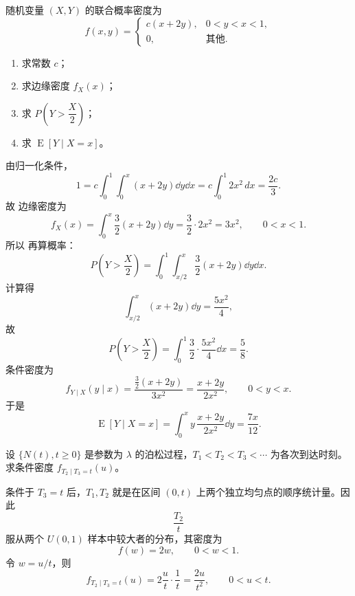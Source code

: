 \begin{question}
随机变量 $(X,Y)$ 的联合概率密度为
\[
f(x,y)=\begin{cases}
 c(x+2y),&0<y<x<1,\\
 0,&\text{其他}.
\end{cases}
\]
\begin{enumerate}
\item 求常数 $c$；
\item 求边缘密度 $f_X(x)$；
\item 求 $P\!\left(Y>\dfrac{X}{2}\right)$；
\item 求 $\operatorname{E}[Y\mid X=x]$。
\end{enumerate}
\begin{solution}
由归一化条件，
\[
1=c\int_0^1\int_0^x (x+2y)\dd{y}\dd{x}
=c\int_0^1 2x^2\,dx
=\frac{2c}{3}.
\]
故
边缘密度为
\[
f_X(x)=\int_0^x \frac32(x+2y)\dd{y}
=\frac32\cdot 2x^2=3x^2,
\qquad 0<x<1.
\]
所以
再算概率：
\[
P\!\left(Y>\frac X2\right)=\int_0^1\int_{x/2}^{x}\frac32(x+2y)\dd{y}\dd{x}.
\]
计算得
\[
\int_{x/2}^{x}(x+2y)\dd{y}=\frac{5x^2}{4},
\]
故
\[
P\!\left(Y>\frac X2\right)=\int_0^1 \frac32\cdot \frac{5x^2}{4}\dd{x}=\frac58.
\]
条件密度为
\[
f_{Y\mid X}(y\mid x)=\frac{\frac32(x+2y)}{3x^2}=\frac{x+2y}{2x^2},
\qquad 0<y<x.
\]
于是
\[
\operatorname{E}[Y\mid X=x]=\int_0^x y\,\frac{x+2y}{2x^2}\dd{y}=\frac{7x}{12}.
\]
\end{solution}
\end{question}

\begin{question}
设 $\{N(t),t\ge 0\}$ 是参数为 $\lambda$ 的泊松过程，$T_1<T_2<T_3<\cdots$ 为各次到达时刻。求条件密度 $f_{T_2\mid T_3=t}(u)$。
\begin{solution}
条件于 $T_3=t$ 后，$T_1,T_2$ 就是在区间 $(0,t)$ 上两个独立均匀点的顺序统计量。因此
\[
\frac{T_2}{t}
\]
服从两个 $U(0,1)$ 样本中较大者的分布，其密度为
\[
f(w)=2w,
\qquad 0<w<1.
\]
令 $w=u/t$，则
\[
f_{T_2\mid T_3=t}(u)=2\frac{u}{t}\cdot \frac1t
=\frac{2u}{t^2},
\qquad 0<u<t.
\]
\end{solution}
\end{question}

